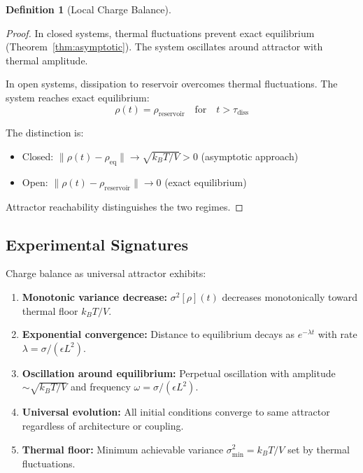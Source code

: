 \documentclass[12pt,a4paper]{article}
\theoremstyle{plain}
\theoremstyle{definition}
\newtheorem{definition}[theorem]{Definition}
\theoremstyle{remark}
\begin{document}
\begin{definition}[Local Charge Balance]
\begin{proof}
In closed systems, thermal fluctuations prevent exact equilibrium (Theorem~\ref{thm:asymptotic}). The system oscillates around attractor with thermal amplitude.

In open systems, dissipation to reservoir overcomes thermal fluctuations. The system reaches exact equilibrium:
\begin{equation}
\rho(t) = \rho_{\text{reservoir}} \quad \text{for} \quad t > \tau_{\text{diss}}
\end{equation}

The distinction is:
\begin{itemize}
\item Closed: $\|\rho(t) - \rho_{\text{eq}}\| \to \sqrt{k_B T / V} > 0$ (asymptotic approach)
\item Open: $\|\rho(t) - \rho_{\text{reservoir}}\| \to 0$ (exact equilibrium)
\end{itemize}

Attractor reachability distinguishes the two regimes.
\end{proof}

\subsection{Experimental Signatures}

Charge balance as universal attractor exhibits:

\begin{enumerate}
\item \textbf{Monotonic variance decrease:} $\sigma^2[\rho](t)$ decreases monotonically toward thermal floor $k_B T / V$.

\item \textbf{Exponential convergence:} Distance to equilibrium decays as $e^{-\lambda t}$ with rate $\lambda = \sigma / (\epsilon L^2)$.

\item \textbf{Oscillation around equilibrium:} Perpetual oscillation with amplitude $\sim \sqrt{k_B T / V}$ and frequency $\omega = \sigma / (\epsilon L^2)$.

\item \textbf{Universal evolution:} All initial conditions converge to same attractor regardless of architecture or coupling.

\item \textbf{Thermal floor:} Minimum achievable variance $\sigma^2_{\min} = k_B T / V$ set by thermal fluctuations.
\end{enumerate}


\end{definition}
\end{document}
